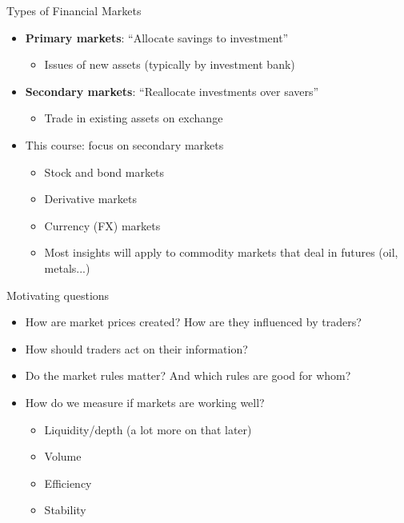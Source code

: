 \documentclass[english,10pt
,aspectratio=169
]{beamer}
\begin{document}
\begin{frame}{Types of Financial Markets}
	\begin{itemize} 
		\item \textbf{Primary markets}: ``Allocate savings to investment''
		\begin{itemize}
			\item Issues of new assets (typically by investment bank)
		\end{itemize}
		\item \textbf{Secondary markets}: ``Reallocate investments over savers''
		\begin{itemize}
			\item Trade in existing assets on exchange
		\end{itemize}	
		\item This course: focus on secondary markets 
		\begin{itemize}
			\item Stock and bond markets
			\item Derivative markets
			\item Currency (FX) markets
			\item Most insights will apply to commodity markets that deal in futures (oil, metals...) 
		\end{itemize}
	\end{itemize}
\end{frame}




\begin{frame}{Motivating questions}
\begin{itemize}
	\item How are market prices created? How are they influenced by traders?
	\item How should traders act on their information?
	\item Do the market rules matter? And which rules are good for whom?
	\item How do we measure if markets are working well?
	\begin{itemize}
		\item Liquidity/depth (a lot more on that later)
		\item Volume
		\item Efficiency
		\item Stability
	\end{itemize}
\end{itemize}
\end{frame}
\end{document}
